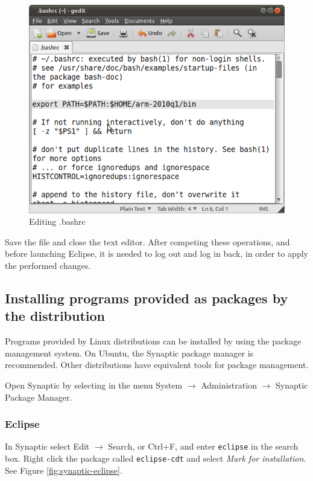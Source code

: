 \documentclass[a4paper, 10pt]{article}
\begin{document}
    \begin{figure}[H]
    \centering
        \includegraphics[width=\textwidth]{./png-install-guide/editing-bashrc.png}
        \caption{Editing .bashrc}
        \label{fig:editing-bashrc}
    \end{figure}

Save the file and close the text editor.
After competing these operations, and before launching Eclipse, it is needed to
log out and log in back, in order to apply the performed changes.

\subsection{Installing programs provided as packages by the distribution}

Programs provided by Linux distributions can be installed by using the package management system.
On Ubuntu, the Synaptic package manager is recommended. 
Other distributions have equivalent tools for package management.

Open Synaptic by selecting in the menu System $\rightarrow$ Administration $\rightarrow$
Synaptic Package Manager.

\subsubsection{Eclipse}

In Synaptic select Edit $\rightarrow$ Search, or Ctrl+F, and enter \verb+eclipse+ 
in the search box. Right click the package called 
\verb+eclipse-cdt+ and select \emph{Mark for installation}. 
See Figure \ref{fig:synaptic-eclipse}.
\end{document}
